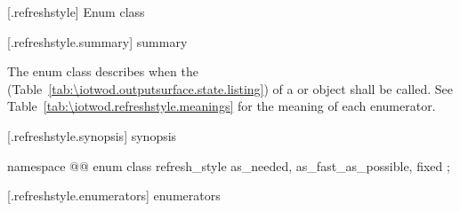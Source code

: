  [\iotwod.refreshstyle] {Enum class }

 [\iotwod.refreshstyle.summary] { summary}

\pnum
The  enum class describes when the  (Table~\ref{tab:\iotwod.outputsurface.state.listing}) of a  or  object shall be called. See Table~\ref{tab:\iotwod.refreshstyle.meanings} for the meaning of each  enumerator.

 [\iotwod.refreshstyle.synopsis] { synopsis}

\begin{codeblock}
namespace @\fullnamespace{}@ {
  enum class refresh_style {
    as_needed,
    as_fast_as_possible,
    fixed
  };
}
\end{codeblock}

 [\iotwod.refreshstyle.enumerators] { enumerators}

